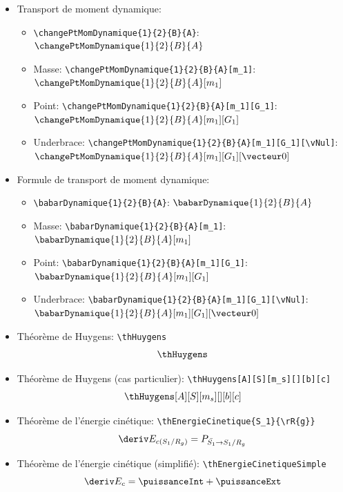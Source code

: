 \documentclass[11pt]{ltxdockit}[2010/09/26]
\begin{document}
\begin{itemize}
\vspace{1em}
\item Transport de moment dynamique: 
\begin{itemize}
\item \verb!\changePtMomDynamique{1}{2}{B}{A}!: $\changePtMomDynamique{1}{2}{B}{A}$
\item Masse: \verb!\changePtMomDynamique{1}{2}{B}{A}[m_1]!: $\changePtMomDynamique{1}{2}{B}{A}[m_1]$
\item Point: \verb!\changePtMomDynamique{1}{2}{B}{A}[m_1][G_1]!: $\changePtMomDynamique{1}{2}{B}{A}[m_1][G_1]$
\item Underbrace: \verb!\changePtMomDynamique{1}{2}{B}{A}[m_1][G_1][\vNul]!: $\changePtMomDynamique{1}{2}{B}{A}[m_1][G_1][\vNul]$
\end{itemize}

\vspace{1em}
\item Formule de transport de moment dynamique: 
\begin{itemize}
\item \verb!\babarDynamique{1}{2}{B}{A}!: $\babarDynamique{1}{2}{B}{A}$
\item Masse: \verb!\babarDynamique{1}{2}{B}{A}[m_1]!: $\babarDynamique{1}{2}{B}{A}[m_1]$
\item Point: \verb!\babarDynamique{1}{2}{B}{A}[m_1][G_1]!: $\babarDynamique{1}{2}{B}{A}[m_1][G_1]$
\item Underbrace: \verb!\babarDynamique{1}{2}{B}{A}[m_1][G_1][\vNul]!: $\babarDynamique{1}{2}{B}{A}[m_1][G_1][\vNul]$
\end{itemize}

\vspace{1em}
\item Théorème de Huygens: \verb!\thHuygens!
\[ \thHuygens \]
\item Théorème de Huygens (cas particulier): \verb!\thHuygens[A][S][m_s][][b][c]!
\[ \thHuygens[A][S][m_s][][b][c] \]
\item Théorème de l'énergie cinétique: \verb!\thEnergieCinetique{S_1}{\rR{g}}!
\[ \thEnergieCinetique{S_1}{\rR{g}} \]
\item Théorème de l'énergie cinétique (simplifié): \verb!\thEnergieCinetiqueSimple!
\[ \thEnergieCinetiqueSimple \]
\end{itemize}
\end{document}
